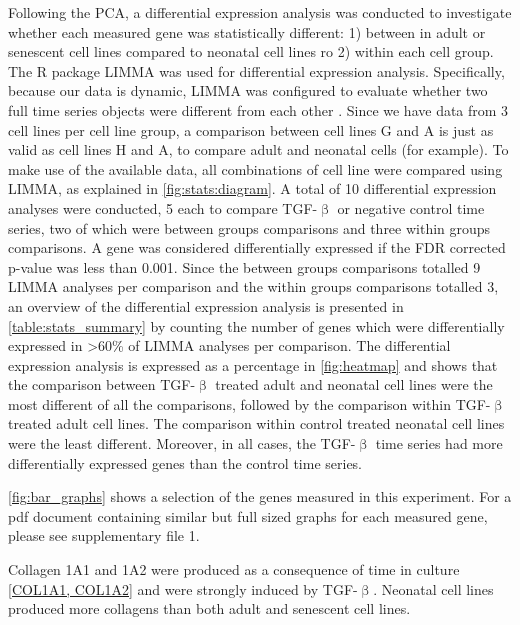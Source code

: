 \documentclass[alpha-refs]{wiley-article}
\newcommand{\tgf}{TGF-$\upbeta$}
\begin{document}
Following the PCA, a differential expression analysis was conducted to investigate whether each measured gene was statistically different: 1) between in adult or senescent cell lines compared to neonatal cell lines ro 2) within each cell group. The R package LIMMA was used for differential expression analysis. Specifically, because our data is dynamic, LIMMA was configured to evaluate whether two full time series objects were different from each other \citep{Ritchie2015, Smyth2004, Smyth2005}. Since we have data from 3 cell lines per cell line group, a comparison between cell lines G and A is just as valid as cell lines H and A, to compare adult and neonatal cells (for example). To make use of the available data, all combinations of cell line were compared using LIMMA, as explained in \cref{fig:stats:diagram}. A total of 10 differential expression analyses were conducted, 5 each to compare \tgf{} or negative control time series, two of which were between groups comparisons and three within groups comparisons. A gene was considered differentially expressed if the FDR corrected p-value was less than 0.001. Since the between groups comparisons totalled 9 LIMMA analyses per comparison and the within groups comparisons totalled 3, an overview of the differential expression analysis is presented in \cref{table:stats_summary} by counting the number of genes which were differentially expressed in >60\% of LIMMA analyses per comparison. The differential expression analysis is expressed as a percentage in \cref{fig:heatmap} and shows that the comparison between \tgf{} treated adult and neonatal cell lines were the most different of all the comparisons, followed by the comparison within \tgf{} treated adult cell lines. The comparison within control treated neonatal cell lines were the least different. Moreover, in all cases, the \tgf{} time series had more differentially expressed genes than the control time series. 

\cref{fig:bar_graphs} shows a selection of the genes measured in this experiment. For a pdf document containing similar but full sized graphs for each measured gene, please see supplementary file 1. 

Collagen 1A1 and 1A2 were produced as a consequence of time in culture \cref{COL1A1, COL1A2} and were strongly induced by \tgf{}. Neonatal cell lines produced more collagens than both adult and senescent cell lines. 
\end{document}
